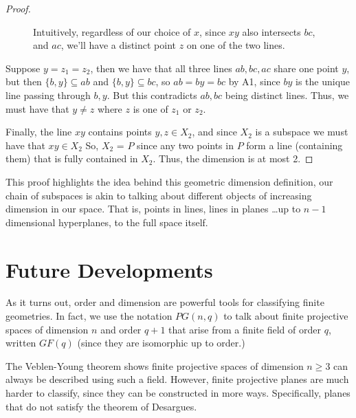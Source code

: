 \documentclass[12pt]{article}
\begin{document}
\begin{proof}
\begin{figure}[h]
            \caption{Intuitively, regardless of our choice of $x$, since $xy$ also intersects $bc$, and $ac$, we'll have a distinct point $z$ on one of the two lines.}
        \end{figure}

        Suppose $y = z_1 = z_2$, then we have that all three lines $ab,bc,ac$ share one point $y$,
        but then $\{b, y\} \subseteq ab$ and $\{b, y\} \subseteq bc$, so $ab = by = bc$ by A1,
        since $by$ is the unique line passing through $b, y$.
        But this contradicts $ab, bc$ being distinct lines.
        Thus, we must have that $y \neq z$ where $z$ is one of $z_1$ or $z_2$.

        Finally, the line $xy$ contains points $y,z \in X_2$, and since $X_2$ is a subspace we must have that $xy \in X_2$
        So, $X_2$ = $P$ since any two points in $P$ form a line (containing them) that is fully contained in $X_2$.
        Thus, the dimension is at most 2.
    \end{proof}

    This proof highlights the idea behind this geometric dimension definition,
    our chain of subspaces is akin to talking about different objects of increasing dimension in our space.
    That is, points in lines, lines in planes \ldots up to $n-1$ dimensional hyperplanes, to the full space itself.

    \section{Future Developments}

    As it turns out, order and dimension are powerful tools for classifying finite geometries.
    In fact, we use the notation $PG(n, q)$ to talk about finite projective spaces of dimension $n$ and order $q+1$
    that arise from a finite field of order $q$, written $GF(q)$ (since they are isomorphic up to order.)\cite[p.~xv]{hirschfeld_general_2016}

    The Veblen-Young theorem shows finite projective spaces of dimension $n \geq 3$ can always be described using such a field.
    However, finite projective planes are much harder to classify, since they can be constructed in more ways.
    Specifically, planes that do not satisfy the theorem of Desargues.\cite[\S3]{beutelspacher_projective_1998}
\end{document}
